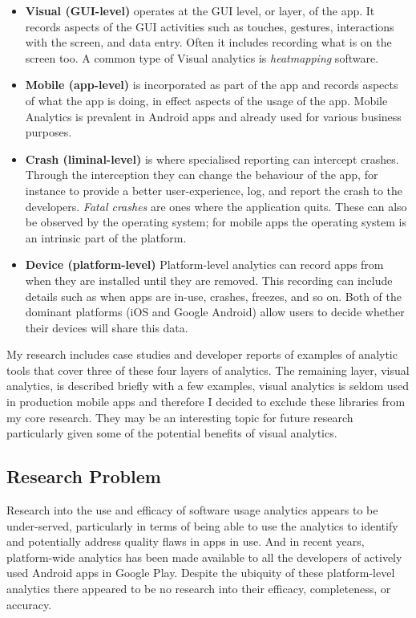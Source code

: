 \begin{itemize}
    \item \textbf{Visual (GUI-level)} operates at the GUI level, or layer, of the app. It records aspects of the GUI activities such as touches, gestures, interactions with the screen, and data entry. Often it includes recording what is on the screen too. A common type of Visual analytics is \emph{heatmapping} software.
    \item \textbf{Mobile (app-level)} is incorporated as part of the app and records aspects of what the app is doing, in effect aspects of the usage of the app. Mobile Analytics is prevalent in Android apps and already used for various business purposes.
    \item \textbf{Crash (liminal-level)} is where specialised reporting can intercept crashes. Through the interception they can change the behaviour of the app, for instance to provide a better user-experience, log, and report the crash to the developers. \emph{Fatal crashes} are ones where the application quits. These can also be observed by the operating system; for mobile apps the operating system is an intrinsic part of the platform.
    \item \textbf{Device (platform-level)} Platform-level analytics can record apps from when they are installed until they are removed. This recording can include details such as when apps are in-use, crashes, freezes, and so on. Both of the dominant platforms (iOS and Google Android) allow users to decide whether their devices will share this data.
\end{itemize}

My research includes case studies and developer reports of examples of analytic tools that cover three of these four layers of analytics. The remaining layer, visual analytics, is described briefly with a few examples, visual analytics is seldom used in production mobile apps and therefore I decided to exclude these libraries from my core research. They may be an interesting topic for future research particularly given some of the potential benefits of visual analytics. %

\subsection{Research Problem}
Research into the use and efficacy of software usage analytics appears to be under-served, particularly in terms of being able to use the analytics to identify and potentially address quality flaws in apps in use. And in recent years, platform-wide analytics has been made available to all the developers of actively used Android apps in Google Play. Despite the ubiquity of these platform-level analytics there appeared to be no research into their efficacy, completeness, or accuracy.


